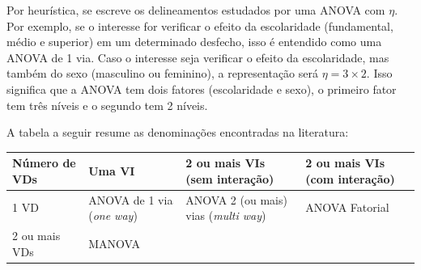\documentclass[
]{book}
\begin{document}
Por heurística, se escreve os delineamentos estudados por uma ANOVA com \(\eta\). Por exemplo, se o interesse for verificar o efeito da escolaridade (fundamental, médio e superior) em um determinado desfecho, isso é entendido como uma ANOVA de 1 via. Caso o interesse seja verificar o efeito da escolaridade, mas também do sexo (masculino ou feminino), a representação será \(\eta = 3 \times 2\). Isso significa que a ANOVA tem dois fatores (escolaridade e sexo), o primeiro fator tem três níveis e o segundo tem 2 níveis.

A tabela a seguir resume as denominações encontradas na literatura:

\begin{longtable}[]{@{}llll@{}}
\toprule
\begin{minipage}[b]{0.22\columnwidth}\raggedright
Número de VDs\strut
\end{minipage} & \begin{minipage}[b]{0.22\columnwidth}\raggedright
Uma VI\strut
\end{minipage} & \begin{minipage}[b]{0.22\columnwidth}\raggedright
2 ou mais VIs (sem interação)\strut
\end{minipage} & \begin{minipage}[b]{0.22\columnwidth}\raggedright
2 ou mais VIs (com interação)\strut
\end{minipage}\tabularnewline
\midrule
\endhead
\begin{minipage}[t]{0.22\columnwidth}\raggedright
1 VD\strut
\end{minipage} & \begin{minipage}[t]{0.22\columnwidth}\raggedright
ANOVA de 1 via (\emph{one way})\strut
\end{minipage} & \begin{minipage}[t]{0.22\columnwidth}\raggedright
ANOVA 2 (ou mais) vias (\emph{multi way})\strut
\end{minipage} & \begin{minipage}[t]{0.22\columnwidth}\raggedright
ANOVA Fatorial\strut
\end{minipage}\tabularnewline
\begin{minipage}[t]{0.22\columnwidth}\raggedright
2 ou mais VDs\strut
\end{minipage} & \begin{minipage}[t]{0.22\columnwidth}\raggedright
MANOVA\strut
\end{minipage} & \begin{minipage}[t]{0.22\columnwidth}\raggedright
\strut
\end{minipage} & \begin{minipage}[t]{0.22\columnwidth}\raggedright
\strut
\end{minipage}\tabularnewline
\bottomrule
\end{longtable}
\end{document}
